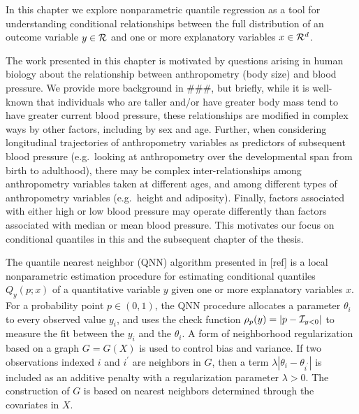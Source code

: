 In this chapter we explore nonparametric quantile regression as a tool for
understanding conditional relationships between the full distribution of
an outcome variable $y\in {\cal R}$ and one or more explanatory variables
$x \in {\cal R}^d$.

The work presented in this chapter is motivated by questions arising in
human biology about the relationship between anthropometry (body size)
and blood pressure.  We provide more background in ###, but briefly, while
it is well-known that individuals who are taller and/or have greater body
mass tend to have greater current blood pressure, these relationships
are modified in complex ways by other factors, including by sex and age.
Further, when considering longitudinal trajectories of anthropometry
variables as predictors of subsequent blood pressure (e.g.\ looking
at anthropometry over the developmental span from birth to adulthood),
there may be complex inter-relationships among anthropometry variables
taken at different ages, and among different types of anthropometry
variables (e.g.\ height and adiposity).  Finally, factors associated with
either high or low blood pressure may operate differently than factors
associated with median or mean blood pressure.  This motivates our focus
on conditional quantiles in this and the subsequent chapter of the thesis.

The quantile nearest neighbor (QNN) algorithm presented in [ref] is
a local nonparametric estimation procedure for estimating conditional
quantiles $Q_y(p; x)$ of a quantitative variable $y$ given one or more
explanatory variables $x$.  For a probability point $p \in (0, 1)$, the
QNN procedure allocates a parameter $\theta_i$ to every observed value
$y_i$, and uses the check function $\rho_p(y) = |p - {\cal I}_{y<0}|$
to measure the fit between the $y_i$ and the $\theta_i$.  A form of
neighborhood regularization based on a graph $G = G(X)$ is used to control
bias and variance.  If two observations indexed $i$ and $i^\prime$ are
neighbors in $G$, then a term $\lambda |\theta_i - \theta_{i^\prime}|$
is included as an additive penalty with a regularization parameter
$\lambda > 0$.  The construction of $G$ is based on nearest neighbors
determined through the covariates in $X$.

